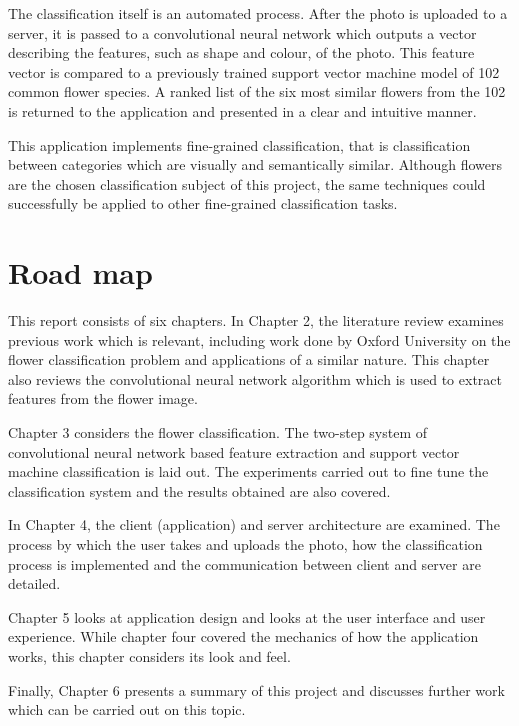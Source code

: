 \documentclass[11pt, a4paper]{report}
\begin{document}
The classification itself is an automated process. After the photo is uploaded to a server, it is passed to a convolutional neural network which outputs a vector describing the features, such as shape and colour, of the photo. This feature vector is compared to a previously trained support vector machine model of 102 common flower species. A ranked list of the six most similar flowers from the 102 is returned to the application and presented in a clear and intuitive manner. 

This application implements fine-grained classification, that is classification between categories which are visually and semantically similar. Although flowers are the chosen classification subject of this project, the same techniques could successfully be applied to other fine-grained classification tasks. 

\section{Road map}

This report consists of six chapters. In Chapter 2, the literature review examines previous work which is relevant, including work done by Oxford University on the flower classification problem and applications of a similar nature. This chapter also reviews the convolutional neural network algorithm which is used to extract features from the flower image.

Chapter 3 considers the flower classification. The two-step system of convolutional neural network based feature extraction and support vector machine classification is laid out. The experiments carried out to fine tune the classification system and the results obtained are also covered. 

In Chapter 4, the client (application) and server architecture are examined. The process by which the user takes and uploads the photo, how the classification process is implemented and the communication between client and server are detailed. 

Chapter 5 looks at application design and looks at the user interface and user experience. While chapter four covered the mechanics of how the application works, this chapter considers its look and feel.

Finally, Chapter 6 presents a summary of this project and discusses further work which can be carried out on this topic.




\end{document}
